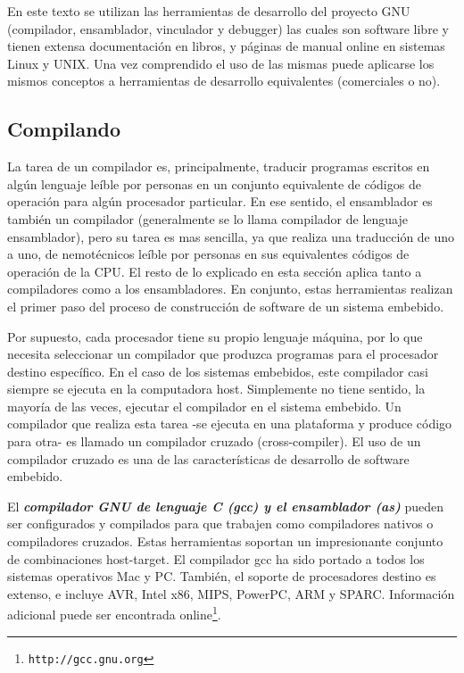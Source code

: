 \documentclass[output=paper, 
colorlinks,
citecolor=brown,
newtxmath
]{langscibook}
\begin{document}
En este texto se utilizan las herramientas de desarrollo del proyecto GNU
(compilador, ensamblador, vinculador y debugger) las cuales son software libre
y tienen extensa documentación en libros, y páginas de manual online en sistemas
Linux y UNIX. Una vez comprendido
el uso de las mismas puede aplicarse los mismos conceptos a herramientas
de desarrollo equivalentes (comerciales o no).

\subsection {Compilando}

La tarea de un compilador es, principalmente, traducir programas escritos en 
algún lenguaje leíble por personas en un conjunto equivalente
de códigos de operación para algún procesador particular. En ese sentido,
el ensamblador es también un compilador (generalmente se lo llama
compilador de lenguaje ensamblador), pero su tarea es mas sencilla, ya que
realiza una traducción de uno a uno, de nemotécnicos leíble por personas
en sus equivalentes códigos de operación de la CPU. El resto de lo explicado en esta sección
aplica tanto a compiladores como a los ensambladores. En conjunto, 
estas herramientas realizan el primer paso del proceso de construcción 
de software de un sistema embebido.

Por supuesto, cada procesador tiene su propio lenguaje máquina, por lo que
necesita seleccionar un compilador que produzca programas para el procesador
destino específico. En el caso de los sistemas embebidos,  este compilador
casi siempre se ejecuta en la computadora host. Simplemente no tiene sentido,
la mayoría de las veces, ejecutar el compilador en el sistema embebido.
Un compilador que realiza esta tarea -se ejecuta en una plataforma  y produce
código para otra- es llamado un compilador cruzado (cross-compiler). El uso de
un compilador cruzado es una de las características de desarrollo de software
embebido.

El \textit{\textbf{compilador GNU de lenguaje C (gcc) y el ensamblador (as)}} pueden ser configurados y compilados
para que trabajen como compiladores nativos o compiladores cruzados. 
Estas herramientas soportan
un impresionante conjunto de combinaciones host-target. El compilador gcc ha sido
portado a todos los sistemas operativos Mac y PC. También, el soporte de procesadores destino
es extenso, e incluye AVR, Intel x86, MIPS, PowerPC, ARM y SPARC. Información
adicional puede ser encontrada online\footnote{\texttt{http://gcc.gnu.org}}.
\end{document}
